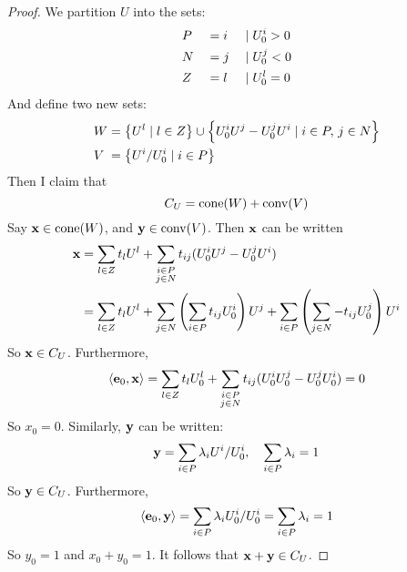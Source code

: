 \begin{proof}
	We partition $U$ into the sets:
	\begin{alignat*}{3}
		 & P &  & = i & \;|\; & U^i_{0} > 0 \\
		 & N &  & = j & \;|\; & U^j_{0} < 0 \\
		 & Z &  & = l & \;|\; & U^l_{0} = 0
	\end{alignat*}
	And define two new sets:
	\begin{align*}
		W   & = \left\{U^l \;|\; l \in Z\right\} \cup \left\{U^i_{0} U^j - U^j_{0} U^i \;|\; i\in P,\, j\in N\right\} \\
		V\; & = \left\{U^i/U^i_{0} \;|\; i \in P\right\}
	\end{align*}
	Then I claim that
	\[ C_U = \operatorname{cone}(W) + \operatorname{conv}(V) \]
	Say $\mathbf{x} \in\operatorname{cone}(W)$, and $\mathbf{y}\in\operatorname{conv}(V)$.  Then $\mathbf{x}$ can be written
	\begin{align*}
		\mathbf{x} & = \sum_{l\in Z}t_l U^l + \sum_{\substack{i\in P \\ j\in N}} t_{ij}(U^i_{0} U^j - U^j_{0} U^i)      \\
		   & = \sum_{l\in Z}t_l U^l + \sum_{j\in N} \left(\sum_{i\in P} t_{ij}U^i_{0}\right) U^j
		+ \sum_{i\in P} \left(\sum_{j\in N} -t_{ij}U^j_{0}\right) U^i
	\end{align*}
	So $\mathbf{x} \in C_U$.  Furthermore,
	\[ \left\langle \mathbf{e}_0, \mathbf{x} \right\rangle = \sum_{l\in Z}t_l U^l_{0} + \sum_{\substack{i\in P \\ j\in N}} t_{ij}(U^i_{0} U^j_{0} - U^j_{0} U^i_{0}) = 0\]
	So $x_0 = 0$.  Similarly, $\mathbf{y}$ can be written:
	\[ \mathbf{y} = \sum_{i\in P} \lambda_i U^i/U^i_{0},\quad\sum_{i\in P}\lambda_i = 1 \]
	So $\mathbf{y} \in C_U$.  Furthermore,
	\[ \left\langle \mathbf{e}_0, \mathbf{y} \right\rangle = \sum_{i\in P} \lambda_i U^i_{0}/U^i_{0} = \sum_{i\in P} \lambda_i  = 1\]
	So $y_0 = 1$ and $x_0 + y_0 = 1$.  It follows that $\mathbf{x} + \mathbf{y} \in C_U$.


\end{proof}
